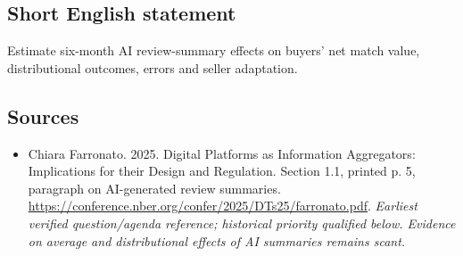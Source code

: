 \documentclass[11pt]{article}
\begin{document}
\subsection{Short English statement}
Estimate six-month AI review-summary effects on buyers' net match value, distributional outcomes, errors and seller adaptation.

\subsection{Sources}
\begin{itemize}\raggedright
\item[\textnormal{[S1]}]\hypertarget{source:30007685:1}{} Chiara Farronato. 2025. Digital Platforms as Information Aggregators: Implications for their Design and Regulation. Section 1.1, printed p. 5, paragraph on AI-generated review summaries.
\url{https://conference.nber.org/confer/2025/DTs25/farronato.pdf}.
{\small\textit{Earliest verified question/agenda reference; historical priority qualified below. Evidence on average and distributional effects of AI summaries remains scant.}}
\end{itemize}
\end{document}
